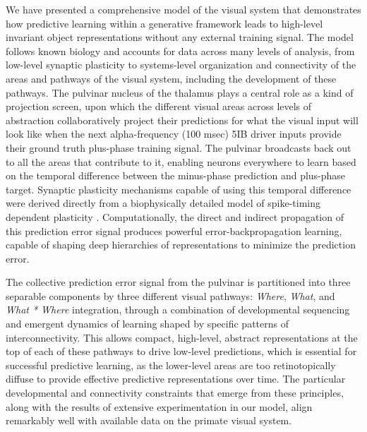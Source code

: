 \documentclass[11pt,twoside]{article}
\newif\myifpdf
\begin{document}
We have presented a comprehensive model of the visual system that demonstrates how predictive learning within a generative framework leads to high-level invariant object representations without any external training signal.  The model follows known biology and accounts for data across many levels of analysis, from low-level synaptic plasticity to systems-level organization and connectivity of the areas and pathways of the visual system, including the development of these pathways.  The pulvinar nucleus of the thalamus plays a central role as a kind of projection screen, upon which the different visual areas across levels of abstraction collaboratively project their predictions for what the visual input will look like when the next alpha-frequency (100 msec) 5IB driver inputs provide their ground truth plus-phase training signal.  The pulvinar broadcasts back out to all the areas that contribute to it, enabling neurons everywhere to learn based on the temporal difference between the minus-phase prediction and plus-phase target.  Synaptic plasticity mechanisms capable of using this temporal difference were derived directly from a biophysically detailed model of spike-timing dependent plasticity \cite{UrakuboHondaFroemkeEtAl08}.  Computationally, the direct and indirect propagation of this prediction error signal produces powerful error-backpropagation learning, capable of shaping deep hierarchies of representations to minimize the prediction error.

The collective prediction error signal from the pulvinar is partitioned into three separable components by three different visual pathways: {\em Where}, {\em What}, and {\em What * Where} integration, through a combination of developmental sequencing and emergent dynamics of learning shaped by specific patterns of interconnectivity.  This allows compact, high-level, abstract representations at the top of each of these pathways to drive low-level predictions, which is essential for successful predictive learning, as the lower-level areas are too retinotopically diffuse to provide effective predictive representations over time.  The particular developmental and connectivity constraints that emerge from these principles, along with the results of extensive experimentation in our model, align remarkably well with available data on the primate visual system.  
\end{document}
